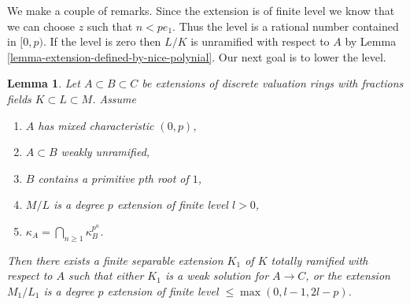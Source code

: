 \documentclass[10pt,a4paper]{amsart}
\theoremstyle{plain}
\newtheorem{lemma}[subsection]{Lemma}
\theoremstyle{definition}
\theoremstyle{remark}
\numberwithin{equation}{subsection}
\begin{document}
\medskip\noindent
We make a couple of remarks. Since the extension is of finite level
we know that we can choose $z$ such that $n < pe_1$.
Thus the level is a rational number contained in $[0, p)$.
If the level is zero then $L/K$ is unramified with respect to $A$ by
Lemma \ref{lemma-extension-defined-by-nice-polynial}.
Our next goal is to lower the level.

\begin{lemma}
\label{lemma-lowering-the-level}
Let $A \subset B \subset C$ be extensions of discrete valuation rings
with fractions fields $K \subset L \subset M$. Assume
\begin{enumerate}
\item $A$ has mixed characteristic $(0, p)$,
\item $A \subset B$ weakly unramified,
\item $B$ contains a primitive $p$th root of $1$,
\item $M/L$ is a degree $p$ extension of finite level $l > 0$,
\item $\kappa_A = \bigcap_{n \geq 1} \kappa_B^{p^n}$.
\end{enumerate}
Then there exists a finite separable extension $K_1$ of $K$
totally ramified with respect to $A$
such that either $K_1$ is a weak solution for $A \to C$, or the extension
$M_1/L_1$ is a degree $p$ extension of finite level
$\leq \max(0, l - 1, 2l - p)$.
\end{lemma}
\end{document}
